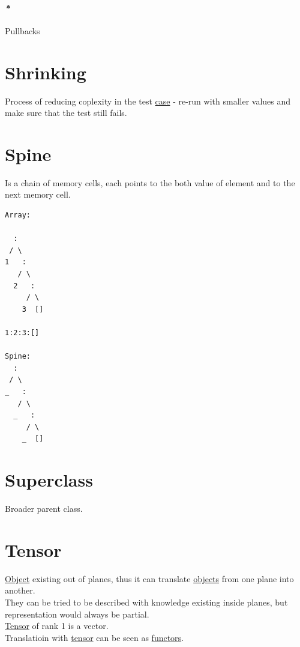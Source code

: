 \documentclass[a4paper,14pt,oneside]{book}
\begin{document}
\subsubsection{\emph{*}}
\label{sec:orgeab6786}
\label{orgbe618a5}Pullbacks\\

\chapter{\label{orgb5a3776}Shrinking}
\label{sec:org69298b9}
Process of reducing coplexity in the test \hyperref[orgb1cd8b6]{case} - re-run with smaller values and make sure that the test still fails.\\

\chapter{\label{org8ec7185}Spine}
\label{sec:org0b7d497}
Is a chain of memory cells, each points to the both value of element and to the next memory cell.\\
\begin{verbatim}
Array:

  :
 / \
1   :
   / \
  2   :
     / \
    3  []

1:2:3:[]

Spine:
  :
 / \
_   :
   / \
  _   :
     / \
    _  []

\end{verbatim}

\chapter{\label{orgdaeddfe}Superclass}
\label{sec:orgb721202}
Broader parent class.\\

\chapter{\label{org2b0aeb4}Tensor}
\label{sec:org16b7ea3}
\hyperref[org65d2cb0]{Object} existing out of planes, thus it can translate \hyperref[org67f2abd]{objects} from one plane into another.\\
They can be tried to be described with knowledge existing inside planes, but representation would always be partial.\\
\hyperref[org2b0aeb4]{Tensor} of rank 1 is a vector.\\

Translatioin with \hyperref[org2b0aeb4]{tensor} can be seen as \hyperref[org8f42943]{functors}.\\
\end{document}
